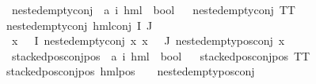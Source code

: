 \begin{isabellebody}
\isanewline
{}\isamarkupfalse%
\ nested{\isacharunderscore}{\kern0pt}empty{\isacharunderscore}{\kern0pt}conj\ {\isacharcolon}{\kern0pt}{\isacharcolon}{\kern0pt}\ {\isachardoublequoteopen}{\isacharparenleft}{\kern0pt}{\isacharprime}{\kern0pt}a{\isacharcomma}{\kern0pt}\ {\isacharprime}{\kern0pt}i{\isacharparenright}{\kern0pt}\ hml\ {\isasymRightarrow}\ bool{\isachardoublequoteclose}\isanewline
\ \ \isanewline
{\isachardoublequoteopen}nested{\isacharunderscore}{\kern0pt}empty{\isacharunderscore}{\kern0pt}conj\ TT{\isachardoublequoteclose}\ {\isacharbar}{\kern0pt}\isanewline
{\isachardoublequoteopen}nested{\isacharunderscore}{\kern0pt}empty{\isacharunderscore}{\kern0pt}conj\ {\isacharparenleft}{\kern0pt}hml{\isacharunderscore}{\kern0pt}conj\ I\ J\ {\isasymPhi}{\isacharparenright}{\kern0pt}{\isachardoublequoteclose}\isanewline
{}\ {\isachardoublequoteopen}{\isasymforall}x\ {\isasymin}\ {\isacharparenleft}{\kern0pt}{\isasymPhi}\ {\isacharbackquote}{\kern0pt}I{\isacharparenright}{\kern0pt}{\isachardot}{\kern0pt}\ nested{\isacharunderscore}{\kern0pt}empty{\isacharunderscore}{\kern0pt}conj\ x{\isachardoublequoteclose}\ {\isachardoublequoteopen}{\isasymforall}x\ {\isasymin}\ {\isacharparenleft}{\kern0pt}{\isasymPhi}\ {\isacharbackquote}{\kern0pt}J{\isacharparenright}{\kern0pt}{\isachardot}{\kern0pt}\ nested{\isacharunderscore}{\kern0pt}empty{\isacharunderscore}{\kern0pt}pos{\isacharunderscore}{\kern0pt}conj\ x{\isachardoublequoteclose}\isanewline
\isanewline
{}\isamarkupfalse%
\ stacked{\isacharunderscore}{\kern0pt}pos{\isacharunderscore}{\kern0pt}conj{\isacharunderscore}{\kern0pt}pos\ {\isacharcolon}{\kern0pt}{\isacharcolon}{\kern0pt}\ {\isachardoublequoteopen}{\isacharparenleft}{\kern0pt}{\isacharprime}{\kern0pt}a{\isacharcomma}{\kern0pt}\ {\isacharprime}{\kern0pt}i{\isacharparenright}{\kern0pt}\ hml\ {\isasymRightarrow}\ bool{\isachardoublequoteclose}\isanewline
\ \ \isanewline
{\isachardoublequoteopen}stacked{\isacharunderscore}{\kern0pt}pos{\isacharunderscore}{\kern0pt}conj{\isacharunderscore}{\kern0pt}pos\ TT{\isachardoublequoteclose}\ {\isacharbar}{\kern0pt}\isanewline
{\isachardoublequoteopen}stacked{\isacharunderscore}{\kern0pt}pos{\isacharunderscore}{\kern0pt}conj{\isacharunderscore}{\kern0pt}pos\ {\isacharparenleft}{\kern0pt}hml{\isacharunderscore}{\kern0pt}pos\ {\isacharunderscore}{\kern0pt}\ {\isasympsi}{\isacharparenright}{\kern0pt}{\isachardoublequoteclose}\ \ {\isachardoublequoteopen}nested{\isacharunderscore}{\kern0pt}empty{\isacharunderscore}{\kern0pt}pos{\isacharunderscore}{\kern0pt}conj\ {\isasympsi}{\isachardoublequoteclose}\ {\isacharbar}{\kern0pt}\isanewline

\end{isabellebody}
